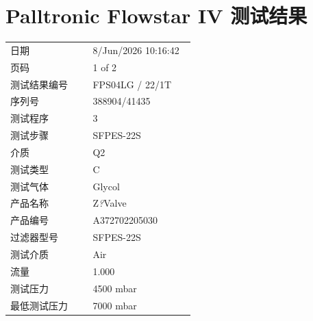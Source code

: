 \documentclass[UTF8,10pt,a4paper,fontset=fandol]{ctexart}
\newcommand{\fieldvalue}[1]{#1}
\begin{document}
\newpage

\section{Palltronic Flowstar IV 测试结果}

\begin{minipage}[t]{0.47\linewidth}
\begin{tabular}{@{}p{0.42\linewidth}p{0.52\linewidth}@{}}
日期 &
\fieldvalue{8/Jun/2026 10:16:42}
\\
页码 &
\fieldvalue{1 of 2}
\\
测试结果编号 &
\fieldvalue{FPS04LG / 22/1T}
\\
序列号 &
\fieldvalue{388904/41435}
\\
测试程序 &
\fieldvalue{3}
\\
测试步骤 &
\fieldvalue{SFPES-22S}
\\
介质 &
\fieldvalue{Q2}
\\
测试类型 &
\fieldvalue{C}
\\
测试气体 &
\fieldvalue{Glycol}
\\
产品名称 &
\fieldvalue{Z\textit{?}Valve}
\\
产品编号 &
\fieldvalue{A372702205030}
\\
过滤器型号 &
\fieldvalue{SFPES-22S}
\\
测试介质 &
\fieldvalue{Air}
\\
流量 &
\fieldvalue{1.000}
\\
测试压力 &
\fieldvalue{4500 mbar}
\\
最低测试压力 &
\fieldvalue{7000 mbar}
\end{tabular}

\vspace{1em}


\end{minipage}
\end{document}
